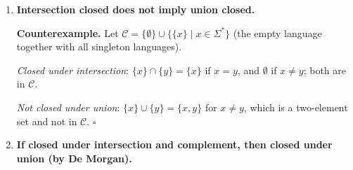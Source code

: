 \begin{enumerate}[{5.}1. ]
\begin{enumerate}[(a)]
  \item \textbf{Complementation: No.}  $\sim L$ contains all words \emph{not} in $L$; since $L$ contains $\pmb{abba}$, $\sim L$ does not contain $\pmb{abba}$, so $\sim L\notin\pmb{E}$.
  \item \textbf{Union: Yes.}  If $\pmb{abba}\in L_1$, then $\pmb{abba}\in L_1\cup L_2$.
  \item \textbf{Intersection: Yes.}  If $L_1,L_2\in\pmb{E}$ then both contain $\pmb{abba}$, so $L_1\cap L_2$ also contains $\pmb{abba}$.  \textbf{Closed.}
  \item \textbf{Concatenation: Yes.}  If $\pmb{abba}\in L_1$, then $\pmb{abba}\cdot\lambda\in L_1\cdot L_2$ (if $\lambda\in L_2$); but $\lambda$ may not be in $L_2$.  Counterexample: $L_1=\{\pmb{abba}\}$, $L_2=\{\pmb{a}\}$.  Then $L_1\cdot L_2=\{\pmb{abbaa}\}$; does $\pmb{abbaa}$ contain $\pmb{abba}$ as a prefix?  Yes!  $\pmb{abbaa}=\pmb{abba}\cdot\pmb{a}$ contains $\pmb{abba}$ as a substring.  But take $L_1=\{\pmb{abba}\}$, $L_2=\{\pmb{c}\}$ (not over $\{\pmb{a},\pmb{b}\}$)---invalid.  Over $\{\pmb{a},\pmb{b}\}$: $L_1\cdot L_2=\{\pmb{abbaa},\pmb{abbab}\}$; both contain $\pmb{abba}$.  In general, any word in $L_1\cdot L_2$ begins with a word from $L_1$ which itself contains $\pmb{abba}$, so the concatenated word contains $\pmb{abba}$.  \textbf{Yes, closed.}
  \item \textbf{Kleene closure: Yes.}  $L^*$ contains $L^1=L$, so $\pmb{abba}\in L\subseteq L^*$.
  \item \textbf{Relative complement: No.}  $L_1\setminus L_2$ might not contain $\pmb{abba}$ if $\pmb{abba}\in L_2$.  E.g., $L_1=L_2=\{\pmb{abba}\}$: $L_1\setminus L_2=\emptyset\notin\pmb{E}$.
\end{enumerate}

\item \textbf{Intersection closed does not imply union closed.}

\textbf{Counterexample.}  Let $\mathcal{C}=\{\emptyset\}\cup\{\{x\}\mid x\in\Sigma^*\}$ (the empty language together with all singleton languages).

\emph{Closed under intersection}: $\{x\}\cap\{y\}=\{x\}$ if $x=y$, and $\emptyset$ if $x\neq y$; both are in $\mathcal{C}$.

\emph{Not closed under union}: $\{x\}\cup\{y\}=\{x,y\}$ for $x\neq y$, which is a two-element set and not in $\mathcal{C}$. $\square$

\item \textbf{If closed under intersection and complement, then closed under union (by De Morgan).}


\end{enumerate}
